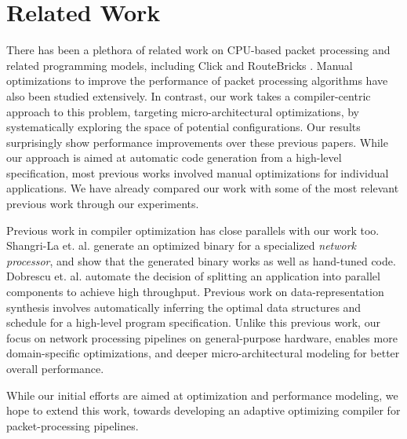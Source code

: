 \section{Related Work}
\label{relatedwork}
There has been a plethora of related work on CPU-based packet processing
and related programming models, including Click \cite{kohler2000click} and RouteBricks \cite{dobrescu2009routebricks}.
Manual optimizations to improve the performance of packet processing algorithms \cite{dobrescu2009routebricks, 189006, Kim:2012:PBC:2349896.2349910, Zhou:2013:SHP:2535372.2535379} have also been studied extensively.
In contrast, our work takes a compiler-centric approach to this problem, targeting micro-architectural
optimizations, by systematically exploring the space of potential configurations. Our results surprisingly
show performance improvements over these previous papers. While our approach is aimed at automatic code generation from a high-level
specification, most previous works involved manual optimizations for individual applications. We have already compared our work
with some of the most relevant previous work through our experiments.


Previous work in compiler optimization has close parallels with our work too.
Shangri-La et. al. \cite{Chen:2005:SAH:1065010.1065038} generate an
optimized binary for a specialized {\em network processor}, and show that the generated binary works as
well as hand-tuned code. Dobrescu et. al. \cite{Dobrescu:2010:CPM:1921151.1921154} automate the decision
of splitting an application into parallel components to achieve high throughput. Previous work on
data-representation synthesis \cite{data_representation_synthesis, concurrent_data_representation_synthesis}
involves automatically inferring the optimal data structures and schedule for a high-level program
specification. Unlike this previous work, our focus on network processing pipelines on
general-purpose hardware, enables
more domain-specific optimizations, and deeper micro-architectural modeling for better
overall performance.

While our initial efforts are aimed at optimization and performance modeling, we hope
to extend this work, towards developing an adaptive optimizing compiler for packet-processing pipelines.

